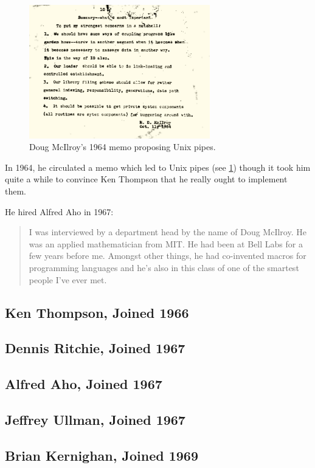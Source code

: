 \begin{figure}
    \centering
    \includegraphics[width=0.7\textwidth]{resource/software/unix/doug-1964-pipes.png}
    \caption{Doug McIlroy's 1964 memo proposing Unix pipes\cite{doug_mcilroy_origin_of_unix_pipes_1964}.}
    \label{fig:unix-pipes-mcilroy-memo}
\end{figure}

In 1964, he circulated a memo which led to Unix pipes\cite{doug_mcilroy_origin_of_unix_pipes_1964}
(see \ref{fig:unix-pipes-mcilroy-memo}) though it took him quite a while to convince
Ken Thompson that he really ought to implement them.

He hired Alfred Aho in 1967\cite{aho_oral_history_2022}:

\begin{quotation}
I was interviewed by a department head by the name of Doug McIlroy. He was an applied
mathematician from MIT. He had been at Bell Labs for a few years before me. Amongst other things, he
had co-invented macros for programming languages and he's also in this class of one of the smartest
people I've ever met.
\end{quotation}

\subsection{Ken Thompson, Joined 1966}



\subsection{Dennis Ritchie, Joined 1967}



\subsection{Alfred Aho, Joined 1967}



\subsection{Jeffrey Ullman, Joined 1967}



\subsection{Brian Kernighan, Joined 1969}
